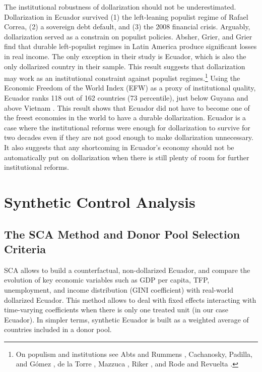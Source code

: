\documentclass[12pt]{article}
\begin{document}
The institutional robustness of dollarization should not be underestimated. Dollarization in Ecuador survived (1) the left-leaning populist regime of Rafael Correa, (2) a sovereign debt default, and (3) the 2008 financial crisis. Arguably, dollarization served as a constrain on populist policies. Absher, Grier, and Grier \parencite*{Absher2020} find that durable left-populist regimes in Latin America produce significant losses in real income. The only exception in their study is Ecuador, which is also the only dollarized country in their sample. This result suggests that dollarization may work as an institutional constraint against populist regimes.\footnote{On populism and institutions see Abts and Rummens \parencite*{Abts2007}, Cachanosky, Padilla, and Gómez \parencite*{Cachanosky2021b}, de la Torre \parencite*{DelaTorre2017}, Mazzuca \parencite*{Mazzuca2013},  Riker \parencite*{Riker1988}, and Rode and Revuelta \parencite*{Rode2015}.} Using the Economic Freedom of the World Index (EFW) as a proxy of institutional quality, Ecuador ranks 118 out of 162 countries (73 percentile), just below Guyana and above Vietnam \parencite{EFW_2019}. This result shows that Ecuador did not have to become one of the freest economies in the world to have a durable dollarization. Ecuador is a case where the institutional reforms were enough for dollarization to survive for two decades even if they are not good enough to make dollarization unnecessary. It also suggests that any shortcoming in Ecuador's economy should not be automatically put on dollarization when there is still plenty of room for further institutional reforms.


\section{Synthetic Control Analysis}
    \label{sec:SCA}

\subsection{The SCA Method and Donor Pool Selection Criteria}

SCA allows to build a counterfactual, non-dollarized Ecuador, and compare the evolution of key economic variables such as GDP per capita, TFP, unemployment, and income distribution (GINI coefficient) with real-world dollarized Ecuador. This method allows to deal with fixed effects interacting with time-varying coefficients when there is only one treated unit (in our case Ecuador). In simpler terms, synthetic Ecuador is built as a weighted average of countries included in a donor pool.
\end{document}
